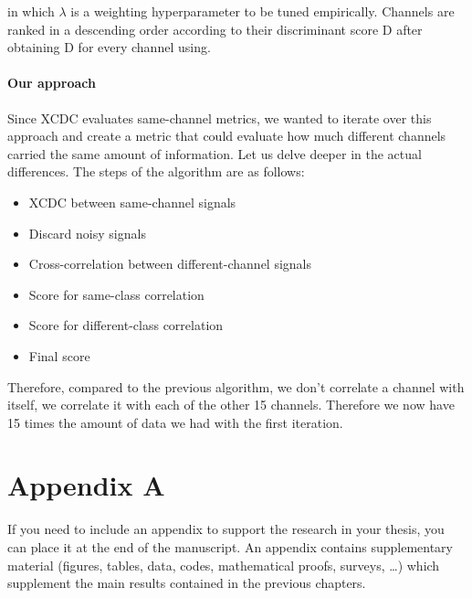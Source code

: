 \documentclass{Configuration_Files/PoliMi3i_thesis}
\begin{document}
in which $\lambda$ is a weighting hyperparameter to be tuned empirically.
Channels are ranked in a descending order according to their discriminant score D after obtaining D for every channel using.

\subsubsection{Our approach}

Since XCDC evaluates same-channel metrics, we wanted to iterate over this approach and create a metric that could evaluate how much different channels carried the same amount of information.
Let us delve deeper in the actual differences.
The steps of the algorithm are as follows:

\begin{itemize}
	\item XCDC between same-channel signals
	\item Discard noisy signals
	\item Cross-correlation between different-channel signals
	\item Score for same-class correlation
	\item Score for different-class correlation
	\item Final score
\end{itemize}


Therefore, compared to the previous algorithm, we don't correlate a channel with itself, we correlate it with each of the other 15 channels.
Therefore we now have 15 times the amount of data we had with the first iteration.



\cleardoublepage
{} %
\appendix
\chapter{Appendix A}
If you need to include an appendix to support the research in your thesis, you can place it at the end of the manuscript.
An appendix contains supplementary material (figures, tables, data, codes, mathematical proofs, surveys, \dots)
which supplement the main results contained in the previous chapters.
\end{document}
